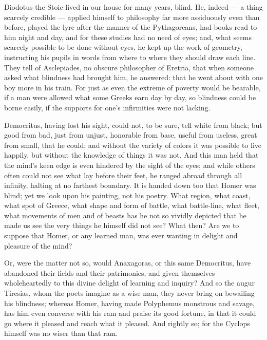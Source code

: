 Diodotus the Stoic lived in our house for many years, blind. He, indeed — a thing scarcely credible — applied himself to philosophy far more assiduously even than before, played the lyre after the manner of the Pythagoreans, had books read to him night and day, and for these studies had no need of eyes; and, what seems scarcely possible to be done without eyes, he kept up the work of geometry, instructing his pupils in words from where to where they should draw each line. They tell of Asclepiades, no obscure philosopher of Eretria, that when someone asked what blindness had brought him, he answered: that he went about with one boy more in his train. For just as even the extreme of poverty would be bearable, if a man were allowed what some Greeks earn day by day, so blindness could be borne easily, if the supports for one's infirmities were not lacking.

 Democritus, having lost his sight, could not, to be sure, tell white from black; but good from bad, just from unjust, honorable from base, useful from useless, great from small, that he could; and without the variety of colors it was possible to live happily, but without the knowledge of things it was not. And this man held that the mind's keen edge is even hindered by the sight of the eyes; and while others often could not see what lay before their feet, he ranged abroad through all infinity, halting at no farthest boundary. It is handed down too that Homer was blind; yet we look upon his painting, not his poetry. What region, what coast, what spot of Greece, what shape and form of battle, what battle-line, what fleet, what movements of men and of beasts has he not so vividly depicted that he made us see the very things he himself did not see? What then? Are we to suppose that Homer, or any learned man, was ever wanting in delight and pleasure of the mind?

 Or, were the matter not so, would Anaxagoras, or this same Democritus, have abandoned their fields and their patrimonies, and given themselves wholeheartedly to this divine delight of learning and inquiry? And so the augur Tiresias, whom the poets imagine as a wise man, they never bring on bewailing his blindness; whereas Homer, having made Polyphemus monstrous and savage, has him even converse with his ram and praise its good fortune, in that it could go where it pleased and reach what it pleased. And rightly so; for the Cyclops himself was no wiser than that ram.

